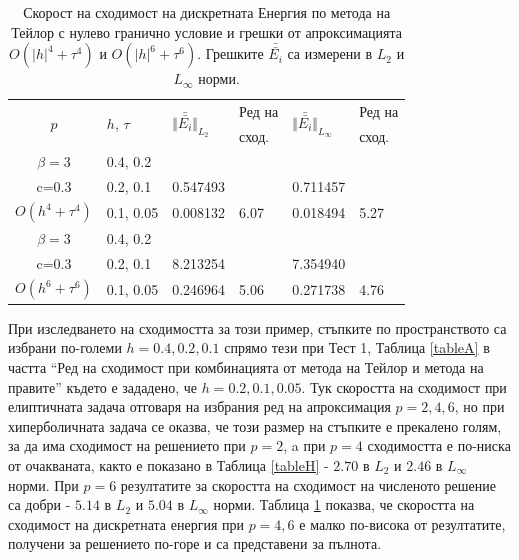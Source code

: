\documentclass[a4paper]{article}
\theoremstyle{remark}
\begin{document}
\begin{large}
\begin{table}[ht]
\centering
\small
		\begin{tabular}{||c|l|ll|ll||}
			\hline
			\hline
      \multirow{2  }{*}{ $p$ }        & \multirow{2  }{*}{$h$, $\tau$}  &  	\multirow{2  }{*}{ $\Vert \bar{\bar{ E_i}} \Vert_{L_2}$ }	&Ред на	& \multirow{2  }{*}{ $\Vert \bar{\bar{ E_i}} \Vert_{L_\infty}$ } 		&Ред на   \\
	                                        &                                                & 							 					&  сход. 	& 								       					& сход. \\
   			\hline 
					\hline 
       $\beta=3$       	&0.4, 0.2     		&             	&           &           		&   \\
                  c=0.3    	&0.2, 0.1     		& 0.547493 	&           &0.711457  		&   \\
$O(h^4+ \tau^4)$ 	&0.1, 0.05   		& 0.008132  	& 6.07  	& 0.018494  		& 5.27 \\
\hline
  $\beta=3$     	 	&0.4, 0.2   		&            	&         	&                  	&             \\
      c=0.3                 	&0.2, 0.1   		& 8.213254	&         	& 7.354940      	&              \\
   $O(h^6+ \tau^6)$ &0.1, 0.05  		& 0.246964 	& 5.06 	& 0.271738  		& 4.76       \\
\hline
\hline 
		\end{tabular}
		\caption{Скорост на сходимост на дискретната Енергия по метода на Тейлор с нулево гранично условие и грешки от апроксимацията $O(|h|^{4} + \tau^4 )$ и $O(|h|^{6} + \tau^6 )$. Грешките $\bar{\bar{ E_i}}$ са измерени в $L_2$ и $L_\infty$ норми.}
\label{tableI}
\end{table}
\FloatBarrier

При изследването на сходимостта за този пример, стъпките по пространството са избрани по-големи $h=0.4, 0.2, 0.1$ спрямо тези при Тест 1, Таблица \ref{tableA} в частта ``Ред на сходимост при комбинацията от метода на Тейлор и метода на правите'' където е зададено, че $h=0.2, 0.1, 0.05$. Тук скоростта на сходимост при елиптичната задача отговаря на избрания ред на апроксимация $p=2,4,6$, но при хиперболичната задача се оказва, че този размер на стъпките е прекалено голям, за да има сходимост на решението при $p=2$, a при $p=4$ сходимостта е по-ниска от очакваната, както е показано в Таблица \ref{tableH} - $2.70$ в $L_2$ и $2.46$ в $L_\infty$ норми. При $p=6$ резултатите за скоростта на сходимост на численото решение са добри - $5.14$ в $L_2$ и $5.04$ в $L_\infty$ норми. Таблица \ref{tableI} показва, че скоростта на сходимост на дискретната енергия при $p=4,6$ е малко по-висока от резултатите, получени за решението по-горе и са представени за пълнота.


\end{large}
\end{document}
